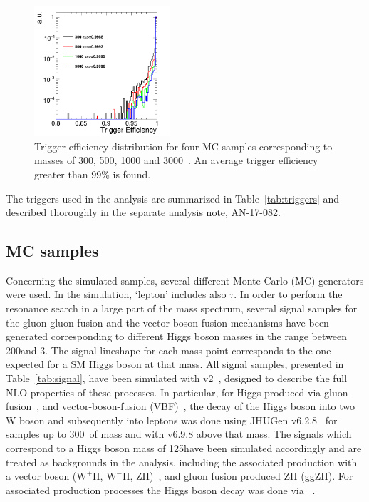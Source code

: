 \begin{figure}[htbp]
\centering
 \includegraphics[width=0.45\textwidth]{Figs/Trigger/triggW.png}
\caption{
      Trigger efficiency distribution for 
      four MC samples corresponding to masses of 300, 500, 1000 and 3000~\GeV.
      An average trigger efficiency greater than 99\% is found.
     }
    \label{Fig:triggerIntegral}
\end{figure}




The triggers used in the analysis are summarized in Table~\ref{tab:triggers} and 
described thoroughly in the separate analysis note, AN-17-082.



\subsection{MC samples}
Concerning the simulated samples, several different Monte Carlo (MC) generators were used. 
In the simulation, `lepton' includes also $\tau$.
In order to perform the resonance search in a large part of the mass spectrum,
several signal samples for the gluon-gluon fusion and the vector boson fusion
mechanisms have been generated corresponding to different Higgs boson masses
in the range between 200\GeV and 3\TeV. The signal lineshape for each mass point corresponds to the one expected for a SM Higgs boson at that mass.
All signal samples, presented in Table~\ref{tab:signal}, have been simulated with
\POWHEG v2~\cite{Nason:2004rx,Frixione:2007vw,Alioli:2010xd}, designed to describe the full NLO properties of these processes.
In particular, for Higgs produced via gluon fusion~\cite{Alioli:2008tz}, and vector-boson-fusion (VBF)~\cite{Nason:2009ai},
the decay of the Higgs boson into two W boson and subsequently into leptons
was done using JHUGen v6.2.8~\cite{jhugen} for samples up to 300~\GeV of mass
and with v6.9.8 above that mass.
The signals which correspond to a Higgs boson mass of 125\GeV have been simulated accordingly and are treated as backgrounds in the analysis, including the associated production with a vector boson ($\mathrm{W^{+}H}$, $\mathrm{W^{-}H}$, ZH)~\cite{Luisoni:2013kna}, and gluon fusion produced ZH (ggZH). For associated production processes the Higgs boson decay was done via ~\cite{Sjostrand:2007gs}.


